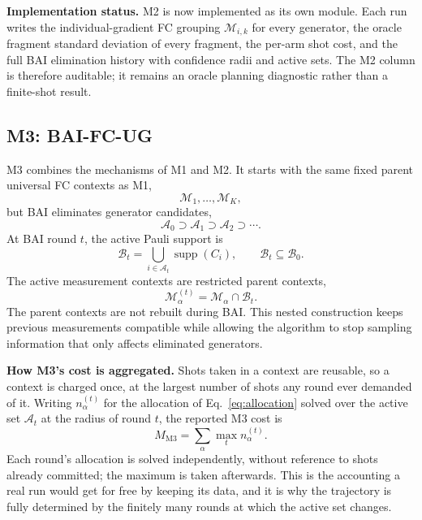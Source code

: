 \documentclass[10pt]{article}
\newcommand{\supp}{\operatorname{supp}}
\begin{document}
\textbf{Implementation status.} M2 is now implemented as its own module. Each run writes the individual-gradient FC grouping $\mathcal M_{i,k}$ for every generator, the oracle fragment standard deviation of every fragment, the per-arm shot cost, and the full BAI elimination history with confidence radii and active sets. The M2 column is therefore auditable; it remains an oracle planning diagnostic rather than a finite-shot result.

\subsection{M3: BAI-FC-UG}

M3 combines the mechanisms of M1 and M2. It starts with the same fixed parent universal FC contexts as M1,
\begin{equation}
  \mathcal M_1,\ldots,\mathcal M_K,
\end{equation}
but BAI eliminates generator candidates,
\begin{equation}
  \mathcal A_0 \supset \mathcal A_1 \supset \mathcal A_2 \supset \cdots .
\end{equation}
At BAI round $t$, the active Pauli support is
\begin{equation}
  \mathcal B_t=\bigcup_{i\in\mathcal A_t}\supp(C_i),
  \qquad
  \mathcal B_t\subseteq\mathcal B_0 .
\end{equation}
The active measurement contexts are restricted parent contexts,
\begin{equation}
  \mathcal M_\alpha^{(t)}=\mathcal M_\alpha\cap\mathcal B_t .
\end{equation}
The parent contexts are not rebuilt during BAI. This nested construction keeps previous measurements compatible while allowing the algorithm to stop sampling information that only affects eliminated generators.

\textbf{How M3's cost is aggregated.} Shots taken in a context are reusable, so a context is charged once, at the largest number of shots any round ever demanded of it. Writing $n_\alpha^{(t)}$ for the allocation of Eq.~\eqref{eq:allocation} solved over the active set $\mathcal A_t$ at the radius of round $t$, the reported M3 cost is
\begin{equation}
  M_{\mathrm{M3}}=\sum_{\alpha}\max_{t} n_\alpha^{(t)} .
  \label{eq:m3-aggregate}
\end{equation}
Each round's allocation is solved independently, without reference to shots already committed; the maximum is taken afterwards. This is the accounting a real run would get for free by keeping its data, and it is why the trajectory is fully determined by the finitely many rounds at which the active set changes.
\end{document}
